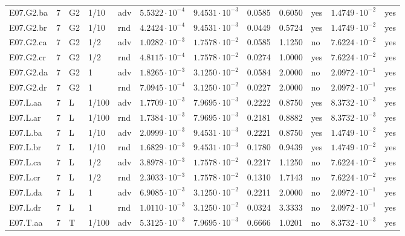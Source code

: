 {\begin{longtable}{@{}lllllllllll l@{}}
E07.G2.ba & 7 & G2 & 1/10 & adv & $5.5322\cdot 10^{-4}$ & $9.4531\cdot 10^{-3}$ & 0.0585 & 0.6050 & yes & $1.4749\cdot 10^{-2}$ & yes \\
E07.G2.br & 7 & G2 & 1/10 & rnd & $4.2424\cdot 10^{-4}$ & $9.4531\cdot 10^{-3}$ & 0.0449 & 0.5724 & yes & $1.4749\cdot 10^{-2}$ & yes \\
E07.G2.ca & 7 & G2 & 1/2 & adv & $1.0282\cdot 10^{-3}$ & $1.7578\cdot 10^{-2}$ & 0.0585 & 1.1250 & no & $7.6224\cdot 10^{-2}$ & yes \\
E07.G2.cr & 7 & G2 & 1/2 & rnd & $4.8115\cdot 10^{-4}$ & $1.7578\cdot 10^{-2}$ & 0.0274 & 1.0000 & yes & $7.6224\cdot 10^{-2}$ & yes \\
E07.G2.da & 7 & G2 & 1 & adv & $1.8265\cdot 10^{-3}$ & $3.1250\cdot 10^{-2}$ & 0.0584 & 2.0000 & no & $2.0972\cdot 10^{-1}$ & yes \\
E07.G2.dr & 7 & G2 & 1 & rnd & $7.0945\cdot 10^{-4}$ & $3.1250\cdot 10^{-2}$ & 0.0227 & 2.0000 & no & $2.0972\cdot 10^{-1}$ & yes \\
E07.L.aa & 7 & L & 1/100 & adv & $1.7709\cdot 10^{-3}$ & $7.9695\cdot 10^{-3}$ & 0.2222 & 0.8750 & yes & $8.3732\cdot 10^{-3}$ & yes \\
E07.L.ar & 7 & L & 1/100 & rnd & $1.7384\cdot 10^{-3}$ & $7.9695\cdot 10^{-3}$ & 0.2181 & 0.8882 & yes & $8.3732\cdot 10^{-3}$ & yes \\
E07.L.ba & 7 & L & 1/10 & adv & $2.0999\cdot 10^{-3}$ & $9.4531\cdot 10^{-3}$ & 0.2221 & 0.8750 & yes & $1.4749\cdot 10^{-2}$ & yes \\
E07.L.br & 7 & L & 1/10 & rnd & $1.6829\cdot 10^{-3}$ & $9.4531\cdot 10^{-3}$ & 0.1780 & 0.9439 & yes & $1.4749\cdot 10^{-2}$ & yes \\
E07.L.ca & 7 & L & 1/2 & adv & $3.8978\cdot 10^{-3}$ & $1.7578\cdot 10^{-2}$ & 0.2217 & 1.1250 & no & $7.6224\cdot 10^{-2}$ & yes \\
E07.L.cr & 7 & L & 1/2 & rnd & $2.3033\cdot 10^{-3}$ & $1.7578\cdot 10^{-2}$ & 0.1310 & 1.7143 & no & $7.6224\cdot 10^{-2}$ & yes \\
E07.L.da & 7 & L & 1 & adv & $6.9085\cdot 10^{-3}$ & $3.1250\cdot 10^{-2}$ & 0.2211 & 2.0000 & no & $2.0972\cdot 10^{-1}$ & yes \\
E07.L.dr & 7 & L & 1 & rnd & $1.0110\cdot 10^{-3}$ & $3.1250\cdot 10^{-2}$ & 0.0324 & 3.3333 & no & $2.0972\cdot 10^{-1}$ & yes \\
E07.T.aa & 7 & T & 1/100 & adv & $5.3125\cdot 10^{-3}$ & $7.9695\cdot 10^{-3}$ & 0.6666 & 1.0201 & no & $8.3732\cdot 10^{-3}$ & yes \\

\end{longtable}}
